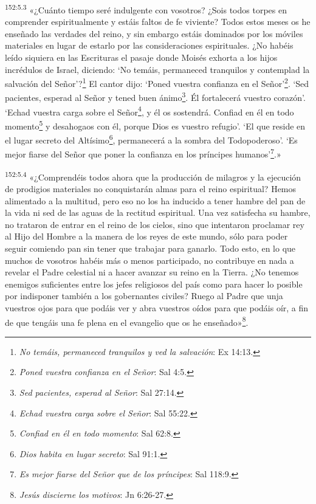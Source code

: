 \par
\textsuperscript{152:5.3} «¿Cuánto tiempo seré indulgente con vosotros? ¿Sois todos torpes en comprender espiritualmente y estáis faltos de fe viviente? Todos estos meses os he enseñado las verdades del reino, y sin embargo estáis dominados por los móviles materiales en lugar de estarlo por las consideraciones espirituales. ¿No habéis leído siquiera en las Escrituras el pasaje donde Moisés exhorta a los hijos incrédulos de Israel, diciendo: `No temáis, permaneced tranquilos y contemplad la salvación del Señor'?\footnote{\textit{No temáis, permaneced tranquilos y ved la salvación}: Ex 14:13.} El cantor dijo: `Poned vuestra confianza en el Señor'\footnote{\textit{Poned vuestra confianza en el Señor}: Sal 4:5.}. `Sed pacientes, esperad al Señor y tened buen ánimo\footnote{\textit{Sed pacientes, esperad al Señor}: Sal 27:14.}. Él fortalecerá vuestro corazón'. `Echad vuestra carga sobre el Señor\footnote{\textit{Echad vuestra carga sobre el Señor}: Sal 55:22.}, y él os sostendrá. Confiad en él en todo momento\footnote{\textit{Confiad en él en todo momento}: Sal 62:8.} y desahogaos con él, porque Dios es vuestro refugio'. `El que reside en el lugar secreto del Altísimo\footnote{\textit{Dios habita en lugar secreto}: Sal 91:1.}, permanecerá a la sombra del Todopoderoso'. `Es mejor fiarse del Señor que poner la confianza en los príncipes humanos'\footnote{\textit{Es mejor fiarse del Señor que de los príncipes}: Sal 118:9.}.»

\par
\textsuperscript{152:5.4} «¿Comprendéis todos ahora que la producción de milagros y la ejecución de prodigios materiales no conquistarán almas para el reino espiritual? Hemos alimentado a la multitud, pero eso no los ha inducido a tener hambre del pan de la vida ni sed de las aguas de la rectitud espiritual. Una vez satisfecha su hambre, no trataron de entrar en el reino de los cielos, sino que intentaron proclamar rey al Hijo del Hombre a la manera de los reyes de este mundo, sólo para poder seguir comiendo pan sin tener que trabajar para ganarlo. Todo esto, en lo que muchos de vosotros habéis más o menos participado, no contribuye en nada a revelar el Padre celestial ni a hacer avanzar su reino en la Tierra. ¿No tenemos enemigos suficientes entre los jefes religiosos del país como para hacer lo posible por indisponer también a los gobernantes civiles? Ruego al Padre que unja vuestros ojos para que podáis ver y abra vuestros oídos para que podáis oír, a fin de que tengáis una fe plena en el evangelio que os he enseñado»\footnote{\textit{Jesús discierne los motivos}: Jn 6:26-27.}.

